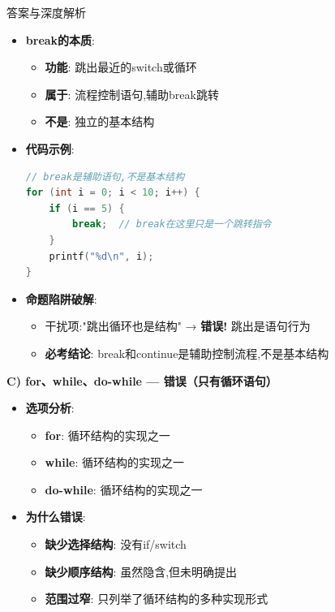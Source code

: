 \documentclass[a4paper,12pt]{article}
\begin{document}
\begin{bluebox}{答案与深度解析}
\begin{itemize}[leftmargin=*, nosep]
		\item \textbf{break的本质}:
		      \begin{itemize}
			      \item \textbf{功能}: 跳出最近的switch或循环
			      \item \textbf{属于}: 流程控制语句,辅助break跳转
			      \item \textbf{不是}: 独立的基本结构
		      \end{itemize}

		\item \textbf{代码示例}:
		      \begin{lstlisting}[language=C]
// break是辅助语句,不是基本结构
for (int i = 0; i < 10; i++) {
    if (i == 5) {
        break;  // break在这里只是一个跳转指令
    }
    printf("%d\n", i);
}
    \end{lstlisting}

		\item \textbf{命题陷阱破解}:
		      \begin{itemize}
			      \item 干扰项:"跳出循环也是结构" → \textbf{错误!} 跳出是语句行为
			      \item \textbf{必考结论}: break和continue是辅助控制流程,不是基本结构
		      \end{itemize}
	\end{itemize}

	\textbf{C) for、while、do-while — 错误（只有循环语句）}
	\begin{itemize}[leftmargin=*, nosep]
		\item \textbf{选项分析}:
		      \begin{itemize}
			      \item \textbf{for}: 循环结构的实现之一
			      \item \textbf{while}: 循环结构的实现之一
			      \item \textbf{do-while}: 循环结构的实现之一
		      \end{itemize}

		\item \textbf{为什么错误}:
		      \begin{itemize}
			      \item \textbf{缺少选择结构}: 没有if/switch
			      \item \textbf{缺少顺序结构}: 虽然隐含,但未明确提出
			      \item \textbf{范围过窄}: 只列举了循环结构的多种实现形式
		      \end{itemize}


\end{itemize}
\end{bluebox}
\end{document}
